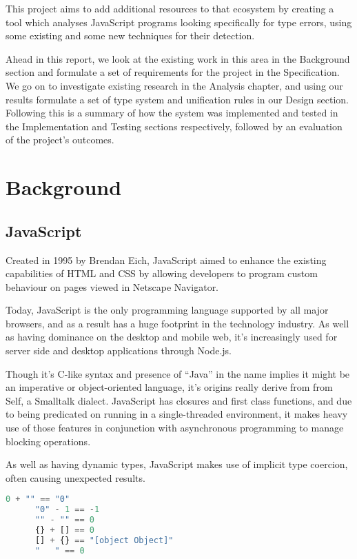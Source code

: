 \documentclass[british, twoside]{bhamthesis}
\theoremstyle{definition}
\begin{document}
  This project aims to add additional resources to that ecosystem by creating a tool which analyses JavaScript programs looking specifically for type errors, using some existing and some new techniques for their detection.

  Ahead in this report, we look at the existing work in this area in the Background section and formulate a set of requirements for the project in the Specification. We go on to investigate existing research in the Analysis chapter, and using our results formulate a set of type system and unification rules in our Design section. Following this is a summary of how the system was implemented and tested in the Implementation and Testing sections respectively, followed by an evaluation of the project's outcomes.

\chapter{Background}

  \section{JavaScript}
    Created in 1995 by Brendan Eich, JavaScript aimed to enhance the existing capabilities of HTML and CSS by allowing developers to program custom behaviour on pages viewed in Netscape Navigator.

    Today, JavaScript is the only programming language supported by all major browsers, and as a result has a huge footprint in the technology industry. As well as having dominance on the desktop and mobile web, it's increasingly used for server side and desktop applications through Node.js.

    Though it’s C-like syntax and presence of “Java” in the name implies it might be an imperative or object-oriented language, it’s origins really derive from from Self, a Smalltalk dialect. JavaScript has closures and first class functions, and due to being predicated on running in a single-threaded environment, it makes heavy use of those features in conjunction with asynchronous programming to manage blocking operations.

    As well as having dynamic types, JavaScript makes use of implicit type coercion, often causing unexpected results.

    \begin{lstlisting}[language=JavaScript]
      0 + "" == "0"
      "0" - 1 == -1
      "" - "" == 0
      {} + [] == 0
      [] + {} == "[object Object]"
      "   " == 0
    \end{lstlisting}
\end{document}

